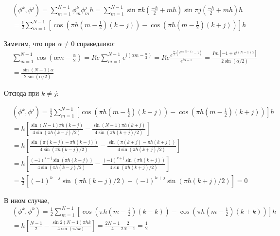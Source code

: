 \documentclass[14pt,a4paper]{extarticle}
\newcommand{\1}{\mathbbm{1}}
\begin{document}
\begin{align*}
    & (\phi^k, \phi^j) = \sum_{m = 1}^{N - 1} \phi_m^k \phi_m^j h 
    = \sum_{m = 1}^{N - 1} \sin{\pi k (\frac{-h}{2} + m h)} \sin{\pi j (\frac{-h}{2} + m h)} h \\ 
    & = \frac{1}{2} \sum_{m = 1}^{N - 1} [ \cos{(\pi h (m - \frac{1}{2})(k - j))} - \cos{(\pi h (m - \frac{1}{2})(k + j))} ] h
\end{align*}

Заметим, что при $\alpha \neq 0$ справедливо:
\begin{align*}
    & \sum_{m = 1}^{N - 1} \cos(\alpha m - \frac{\alpha}{2}) = Re\sum_{m = 1}^{N - 1} e^{i (\alpha m - \frac{\alpha}{2})} 
     = Re \frac{e^{\frac{i \alpha}{2}(e^{i \alpha (N - 1)} - 1)}}{e^{i \alpha - 1}} 
     = \frac{Im [-1 + e^{i (N - 1) \alpha}]}{2 \sin(\alpha/2)} \\
    & = \frac{\sin{(N - 1) \alpha}}{2 \sin(\alpha/2)}
\end{align*}

Отсюда при $k \neq j$:

\begin{align*}
    & (\phi^k, \phi^j) 
    = \frac{1}{2} \sum_{m = 1}^{N - 1} [ \cos{(\pi h (m - \frac{1}{2})(k - j))} - \cos{(\pi h (m - \frac{1}{2})(k + j))} ] h \\
    & = h \left[ \frac{\sin{(N - 1) \pi h (k - j)}}{4 \sin(\pi h (k - j)/2)} - \frac{\sin{(N - 1) \pi h (k + j)}}{4 \sin(\pi h (k + j)/2)} \right] \\
    & = h \left[ \frac{\sin(\pi (k - j) - \pi h (k - j))}{4 \sin(\pi h (k - j)/2)}
        - \frac{\sin(\pi (k + j) - \pi h (k + j))}{4 \sin(\pi h (k + j)/2)}\right] \\
    & = h \left[ \frac{(-1)^{k-j}\sin(\pi h (k - j))}{4 \sin(\pi h (k - j)/2)}
    - \frac{(-1)^{k+j}\sin(\pi h (k + j))}{4 \sin(\pi h (k + j)/2)}\right] \\
    & = \frac{h}{2} [(-1)^{k-j}\sin(\pi h (k - j)/2) - (-1)^{k+j}\sin(\pi h (k + j)/2)] = 0
\end{align*}

В ином случае, 
\begin{align*}
    & (\phi^k, \phi^k) 
    = \frac{1}{2} \sum_{m = 1}^{N - 1} [ \cos{(\pi h (m - \frac{1}{2})(k - k))} - \cos{(\pi h (m - \frac{1}{2})(k + k))} ] h \\
    & = h \left[ \frac{N - 1}{2} - \frac{\sin{2 (N - 1) \pi h k}}{4 \sin(\pi h k)} \right] 
    = \frac{2 N - 1}{4} \frac{2}{2 N - 1} = \frac{1}{2}
\end{align*}
\end{document}
